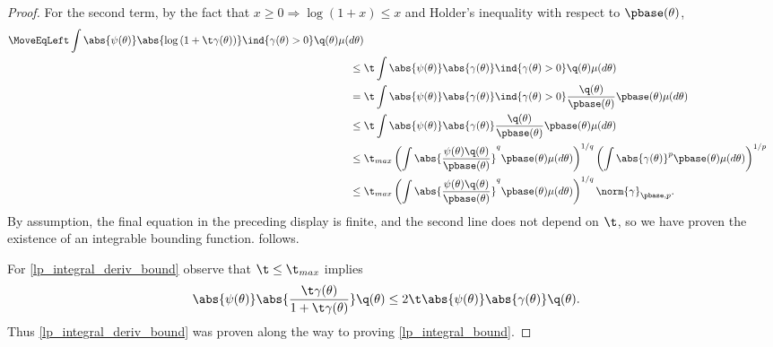 \begin{lem}
\begin{proof}
For the second term, by the fact that $x \ge 0 \Rightarrow \log (1 + x) \le x$
and Holder's inequality with respect to $\pbase(\theta)$,
%
\begin{align*}
%
\MoveEqLeft
\int \abs{\psi(\theta)}
    \abs{\log\left(1 + \t \gamma(\theta)\right)}
    \ind{\gamma(\theta) > 0}
    \q(\theta)\mu(d\theta)
\\\le{}&
\t
\int \abs{\psi(\theta)}
    \abs{\gamma(\theta)}
    \ind{\gamma(\theta) > 0}
    \q(\theta)\mu(d\theta)
\\={}&
\t
\int \abs{\psi(\theta)}
    \abs{\gamma(\theta)}
    \ind{\gamma(\theta) > 0}
    \frac{\q(\theta)}{\pbase(\theta)} \pbase(\theta) \mu(d\theta)
\\\le{}&
\t
\int \abs{\psi(\theta)}
    \abs{\gamma(\theta)}
    \frac{\q(\theta)}{\pbase(\theta)} \pbase(\theta) \mu(d\theta)
\\\le{}&
\t_{max}
\left(
\int
    \abs{\frac{\psi(\theta)\q(\theta)}{\pbase(\theta)}}^q
    \pbase(\theta) \mu(d\theta)
\right)^{1/q}
\left(
\int\abs{\gamma(\theta)}^p \pbase(\theta) \mu(d\theta)
\right)^{1/p}
\\\le{}&
\t_{max}
\left(
\int
    \abs{\frac{\psi(\theta)\q(\theta)}{\pbase(\theta)}}^q
    \pbase(\theta) \mu(d\theta)
\right)^{1/q}
\norm{\gamma}_{\pbase,p}.
%
\end{align*}
%
By assumption, the final equation in the preceding display is finite, and the
second line does not depend on $\t$, so we have proven the existence of an
integrable bounding function.   follows.

For \eqref{lp_integral_deriv_bound} observe that $\t \le \t_{max}$ implies
%
\begin{align*}
%
\abs{\psi(\theta)}
    \abs{\frac{\t \gamma(\theta)}{1 + \t \gamma(\theta)}} \q(\theta)
\le{}&
2 \t \abs{\psi(\theta)} \abs{\gamma(\theta)} \q(\theta).
%
\end{align*}
%
Thus \eqref{lp_integral_deriv_bound} was proven along the way to
proving \eqref{lp_integral_bound}.
%
\end{proof}
%
\end{lem}








